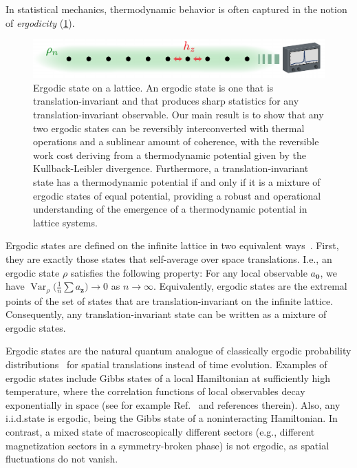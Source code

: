 \documentclass[prl,reprint,longbibliography,superscriptaddress]{revtex4-1}
\begin{document}
In statistical mechanics, thermodynamic behavior is often captured in the notion
of \emph{ergodicity} (\cref{fig:LatticeErgodicState}).
\begin{figure}
  \centering
  \includegraphics{fig-02.pdf}
  \caption{Ergodic state on a lattice.  An ergodic state is one that is
    translation-invariant and that produces sharp statistics for any
    translation-invariant observable.  Our main result is to show that any two
    ergodic states can be reversibly interconverted with thermal operations and
    a sublinear amount of coherence, with the reversible work cost deriving from
    a thermodynamic potential given by the Kullback-Leibler divergence.
    Furthermore, a translation-invariant state has a thermodynamic potential if
    and only if it is a mixture of ergodic states of equal potential, providing
    a robust and operational understanding of the emergence of a thermodynamic
    potential in lattice systems.}
  \label{fig:LatticeErgodicState}
\end{figure}
Ergodic states are defined on the infinite lattice in two equivalent
ways~\cite{BookRuelle_StatMechRigorous,BookBratteliRobinson_OpAlgQStatMech1,BookBratteliRobinson_OpAlgQStatMech2,Bjelakovic2004CMP_ergodic,Bjelakovic2004IM_lattice}.  First, they are exactly
those states that self-average over space translations. 
I.e., an ergodic state $\rho$ satisfies the following property: For any local
observable $a_{\boldsymbol{0}}$,
we have $\operatorname{Var}_\rho\bigl(\frac1n\sum a_{\boldsymbol{z}}\bigr) \to 0$ as
$n\to\infty$.
Equivalently, ergodic states are the extremal points of the set of states that
are translation-invariant on the infinite lattice.  Consequently, any
translation-invariant state can be written as a mixture of ergodic states.

Ergodic states are the natural quantum analogue of classically ergodic
probability distributions~\cite{BookCoverThomas2006_InfTheory,BookIsrael_ConvexityTheoryLatticeGases} for spatial translations instead of
time evolution.
Examples of ergodic states include Gibbs states of a local Hamiltonian at
sufficiently high temperature, where the correlation functions of local
observables decay exponentially in space (see for example Ref.~\cite{Tasaki2018JSP_equivalence}
and references therein).  Also, any i.i.d.\@ state is ergodic, being the Gibbs
state of a noninteracting Hamiltonian.  In contrast, a mixed state of
macroscopically different sectors (e.g., different magnetization sectors in a
symmetry-broken phase) is not ergodic, as spatial fluctuations do not vanish.
\end{document}
